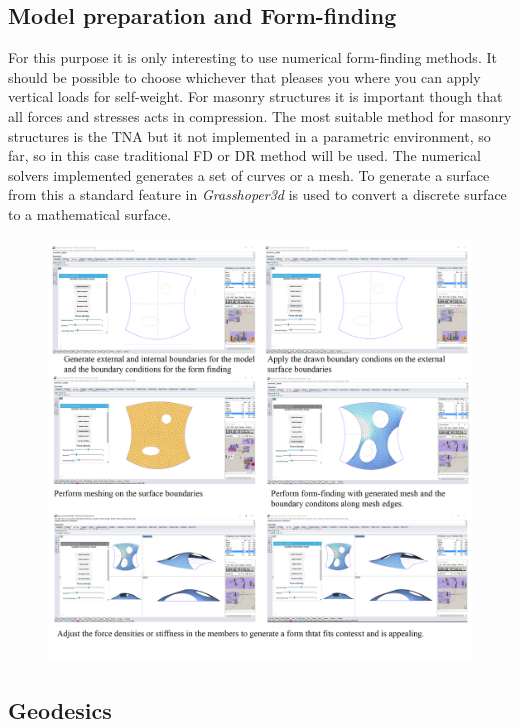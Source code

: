 \subsection{Model preparation and Form-finding}


For this purpose it is only interesting to use numerical form-finding methods. It should be possible to choose whichever that pleases you where you can apply vertical loads for self-weight. For masonry structures it is important though that all forces and stresses acts in compression. The most suitable method for masonry structures is the TNA but it not implemented in a parametric environment, so far, so in this case traditional FD or DR method will be used. The numerical solvers implemented generates a set of curves or a mesh. To generate a surface from this a standard feature in \textit{Grasshoper3d} is used to convert a discrete surface to a mathematical surface.



\begin{figure}[H]
\centering
\includegraphics[width = 1.0\linewidth ]{figure/Method/ModelGen.jpg}
\end{figure}



\subsection{Geodesics}



